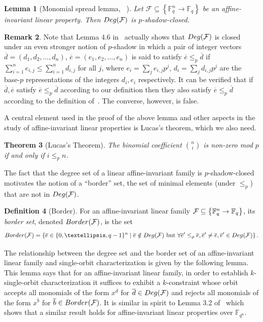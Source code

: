 \documentclass[10pt]{article}
\newtheorem{theorem}{Theorem}[section]
\newtheorem{lemma}[theorem]{Lemma}
\theoremstyle{definition}
\newtheorem{definition}[theorem]{Definition}
\newtheorem{remark}[theorem]{Remark}
\numberwithin{equation}{section}
\newcommand{\calf}{{\cal F}}
\newcommand{\F}{{\mathbb{F}}}
\newcommand{\cF}{{\mathcal{F}}}
\newcommand{\set}[1]{\left\{{#1}\right\}}
\newcommand{\Border}{{\rm{Border}}}
\newcommand{\Deg}{{\rm{Deg}}}
\begin{document}
\begin{lemma}[Monomial spread lemma, {\protect~\cite[Lemma 4.6]{KS08-ECCC}}]\label{lem:monomial-spread}
%
Let $\mathcal{F} \subseteq \set{\F_{q}^n \to \F_q}$ be an affine-invariant linear property. Then $\Deg(\cF)$ is $p$-shadow-closed.
\end{lemma}

\begin{remark}
Note that Lemma 4.6 in~\cite{KS08-ECCC} actually shows that $\Deg(\cF)$ is closed under an even stronger notion of $p$-shadow in which a pair of integer vectors $ \overline d=(d_1,d_2,\ldots,d_n)$, $\overline e=(e_1,e_2,\ldots,e_n)$ is said to satisfy
$\overline e \leq_p  \overline d$ if $\sum_{i=1}^n e_{i,j} \leq \sum_{i=1}^n d_{i,j}$ for all $j$, where $e_i = \sum_{j} e_{i,j} p^j$,  $d_i = \sum_{j} d_{i,j} p^j$ are the base-$p$ representations
of the integers $d_i, e_i$ respectively. It can be verified that if $\overline d, \overline e$ satisfy $\overline e \leq_p \overline d$ according to our definition then they also satisfy  $\overline e \leq_p \overline d$   according to the definition of~\cite{KS08-ECCC}. The converse, however, is false.
\end{remark}

A central element used in the proof of the above lemma and
other aspects in the study of affine-invariant linear properties is
Lucas's theorem, which we also need.

\begin{theorem}[Lucas's Theorem]\label{thm:luca}
The %
binomial
coefficient $\binom {n} {i} $ is non-zero mod $p$ if and only if $i \leq_p n$.
\end{theorem}

The fact that the degree set of a linear affine-invariant family is $p$-shadow-closed 
motivates the notion of a ``border'' set, the set of minimal elements (under $\leq_p$) that are not in $\Deg(\cF)$.
\begin{definition}[Border]\label{defn:border}
For an affine-invariant linear family $\calf \subseteq \set{\F_q^n \to \F_q}$, its \emph{border set}, denoted $\Border(\calf)$,
is the set \[\Border(\calf) = \{\overline e \in \{0,\ldots,q-1\}^n \;|\; \overline e \notin \Deg(\calf) \text{~but~}
\forall \overline e' \leq_p \overline e, \overline e'\ne \overline e, \overline e' \in \Deg(\calf)\}\,.\]
\end{definition}

The relationship between the degree set and the border set of an affine-invariant linear family and single-orbit characterization is given by the following lemma.
This lemma  says that for an affine-invariant linear family, in order to establish $k$-single-orbit characterization it suffices to exhibit a $k$-constraint whose orbit accepts
all monomials of the form $x^{\overline d}$ for
 $\overline d \in \Deg(\cF)$ and  rejects all monomials of the form $x^{\overline b}$ for
  $\overline b \in \Border(\cF)$. It is similar in spirit to Lemma 3.2 of~\cite{BGMSS11} which shows that a similar result holds for affine-invariant linear properties over $\F_{q^n}$.
\end{document}
